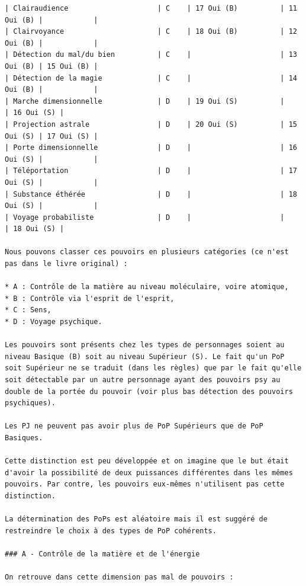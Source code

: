 \documentclass[11pt]{article}
\begin{document}
{\begin{verbatim}
| Clairaudience                     | C    | 17 Oui (B)          | 11 Oui (B) |            |
| Clairvoyance                      | C    | 18 Oui (B)          | 12 Oui (B) |            |
| Détection du mal/du bien          | C    |                     | 13 Oui (B) | 15 Oui (B) |
| Détection de la magie             | C    |                     | 14 Oui (B) |            |
| Marche dimensionnelle             | D    | 19 Oui (S)          |            | 16 Oui (S) |
| Projection astrale                | D    | 20 Oui (S)          | 15 Oui (S) | 17 Oui (S) |
| Porte dimensionnelle              | D    |                     | 16 Oui (S) |            |
| Téléportation                     | D    |                     | 17 Oui (S) |            |
| Substance éthérée                 | D    |                     | 18 Oui (S) |            |
| Voyage probabiliste               | D    |                     |            | 18 Oui (S) |

Nous pouvons classer ces pouvoirs en plusieurs catégories (ce n'est pas dans le livre original) :

* A : Contrôle de la matière au niveau moléculaire, voire atomique,
* B : Contrôle via l'esprit de l'esprit,
* C : Sens,
* D : Voyage psychique.

Les pouvoirs sont présents chez les types de personnages soient au niveau Basique (B) soit au niveau Supérieur (S). Le fait qu'un PoP soit Supérieur ne se traduit (dans les règles) que par le fait qu'elle soit détectable par un autre personnage ayant des pouvoirs psy au double de la portée du pouvoir (voir plus bas détection des pouvoirs psychiques).

Les PJ ne peuvent pas avoir plus de PoP Supérieurs que de PoP Basiques.

Cette distinction est peu développée et on imagine que le but était d'avoir la possibilité de deux puissances différentes dans les mêmes pouvoirs. Par contre, les pouvoirs eux-mêmes n'utilisent pas cette distinction.

La détermination des PoPs est aléatoire mais il est suggéré de restreindre le choix à des types de PoP cohérents.

### A - Contrôle de la matière et de l'énergie

On retrouve dans cette dimension pas mal de pouvoirs :


\end{verbatim}}
\end{document}
